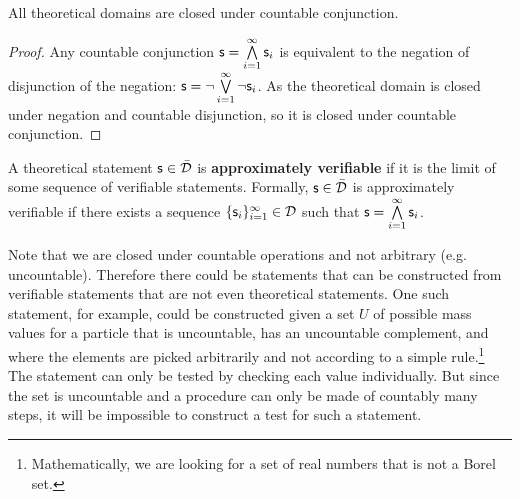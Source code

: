 	
	\begin{mathSection}
		\begin{prop}
			All theoretical domains are closed under countable conjunction.
		\end{prop}
		
		\begin{proof}
			Any countable conjunction $\mathsf{s} = \bigwedge\limits_{i=1}^{\infty} \mathsf{s}_i$ is equivalent to the negation of disjunction of the negation: $\mathsf{s} = \neg\bigvee\limits_{i=1}^{\infty} \neg\mathsf{s}_i$. As the theoretical domain is closed under negation and countable disjunction, so it is closed under countable conjunction.  
		\end{proof}
		
		\begin{defn}\label{pm-vs-defApproximatelyVerifiable}
			A theoretical statement $\mathsf{s} \in \bar{\mathcal{D}}$ is \textbf{approximately verifiable} if it is the limit of some sequence of verifiable statements. Formally, $\mathsf{s} \in \bar{\mathcal{D}}$ is approximately verifiable if there exists a sequence $\{\mathsf{s}_i\}_{i=1}^{\infty} \in \mathcal{D}$ such that $\mathsf{s} = \bigwedge\limits_{i=1}^{\infty} \mathsf{s}_i$.
		\end{defn}
	\end{mathSection}
	
	Note that we are closed under countable operations and not arbitrary (e.g. uncountable). Therefore there could be statements that can be constructed from verifiable statements that are not even theoretical statements. One such statement, for example, could be constructed given a set $U$ of possible mass values for a particle that is uncountable, has an uncountable complement, and where the elements are picked arbitrarily and not according to a simple rule.\footnote{Mathematically, we are looking for a set of real numbers that is not a Borel set.} The statement  can only be tested by checking each value individually. But since the set is uncountable and a procedure can only be made of countably many steps, it will be impossible to construct a test for such a statement.
	
